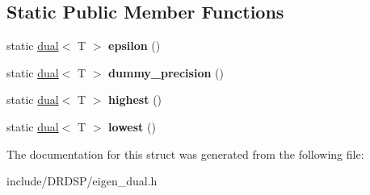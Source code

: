 \subsection*{Static Public Member Functions}
\begin{DoxyCompactItemize}
\item 
\hypertarget{struct_eigen_1_1_num_traits_3_01dual_3_01_t_01_4_01_4_aabaf964c5626b1c2ed65d05983ee8e4b}{static \hyperlink{struct_d_r_d_s_p_1_1dual}{dual}$<$ T $>$ {\bfseries epsilon} ()}\label{struct_eigen_1_1_num_traits_3_01dual_3_01_t_01_4_01_4_aabaf964c5626b1c2ed65d05983ee8e4b}

\item 
\hypertarget{struct_eigen_1_1_num_traits_3_01dual_3_01_t_01_4_01_4_af6ed000841e7d59405efc2d0bcc5bd1f}{static \hyperlink{struct_d_r_d_s_p_1_1dual}{dual}$<$ T $>$ {\bfseries dummy\-\_\-precision} ()}\label{struct_eigen_1_1_num_traits_3_01dual_3_01_t_01_4_01_4_af6ed000841e7d59405efc2d0bcc5bd1f}

\item 
\hypertarget{struct_eigen_1_1_num_traits_3_01dual_3_01_t_01_4_01_4_a6a045ef0e706fed8a0302dec589495cc}{static \hyperlink{struct_d_r_d_s_p_1_1dual}{dual}$<$ T $>$ {\bfseries highest} ()}\label{struct_eigen_1_1_num_traits_3_01dual_3_01_t_01_4_01_4_a6a045ef0e706fed8a0302dec589495cc}

\item 
\hypertarget{struct_eigen_1_1_num_traits_3_01dual_3_01_t_01_4_01_4_a343d65ec0cc99937e9e272ab59867cb8}{static \hyperlink{struct_d_r_d_s_p_1_1dual}{dual}$<$ T $>$ {\bfseries lowest} ()}\label{struct_eigen_1_1_num_traits_3_01dual_3_01_t_01_4_01_4_a343d65ec0cc99937e9e272ab59867cb8}

\end{DoxyCompactItemize}


The documentation for this struct was generated from the following file\-:\begin{DoxyCompactItemize}
\item 
include/\-D\-R\-D\-S\-P/eigen\-\_\-dual.\-h\end{DoxyCompactItemize}
